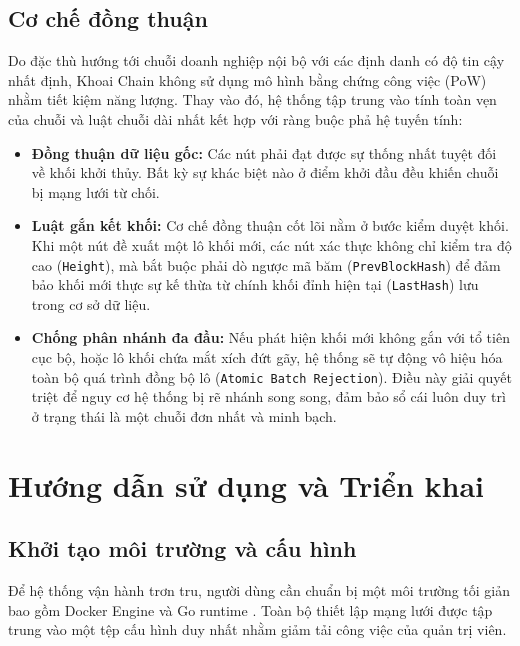 \documentclass[12pt,a4paper]{article}
\begin{document}
\subsection{Cơ chế đồng thuận}
Do đặc thù hướng tới chuỗi doanh nghiệp nội bộ với các định danh có độ tin cậy nhất định, Khoai Chain không sử dụng mô hình bằng chứng công việc (PoW) nhằm tiết kiệm năng lượng. Thay vào đó, hệ thống tập trung vào tính toàn vẹn của chuỗi và luật chuỗi dài nhất kết hợp với ràng buộc phả hệ tuyến tính:
\begin{itemize}
    \item \textbf{Đồng thuận dữ liệu gốc:} Các nút phải đạt được sự thống nhất tuyệt đối về khối khởi thủy. Bất kỳ sự khác biệt nào ở điểm khởi đầu đều khiến chuỗi bị mạng lưới từ chối.
    \item \textbf{Luật gắn kết khối:} Cơ chế đồng thuận cốt lõi nằm ở bước kiểm duyệt khối. Khi một nút đề xuất một lô khối mới, các nút xác thực không chỉ kiểm tra độ cao (\texttt{Height}), mà bắt buộc phải dò ngược mã băm (\texttt{PrevBlockHash}) để đảm bảo khối mới thực sự kế thừa từ chính khối đỉnh hiện tại (\texttt{LastHash}) lưu trong cơ sở dữ liệu.
    \item \textbf{Chống phân nhánh đa đầu:} Nếu phát hiện khối mới không gắn với tổ tiên cục bộ, hoặc lô khối chứa mắt xích đứt gãy, hệ thống sẽ tự động vô hiệu hóa toàn bộ quá trình đồng bộ lô (\texttt{Atomic Batch Rejection}). Điều này giải quyết triệt để nguy cơ hệ thống bị rẽ nhánh song song, đảm bảo sổ cái luôn duy trì ở trạng thái là một chuỗi đơn nhất và minh bạch.
\end{itemize}
\newpage

\section{Hướng dẫn sử dụng và Triển khai}

\subsection{Khởi tạo môi trường và cấu hình}
Để hệ thống vận hành trơn tru, người dùng cần chuẩn bị một môi trường tối giản bao gồm Docker Engine và Go runtime \cite{donovan}. Toàn bộ thiết lập mạng lưới được tập trung vào một tệp cấu hình duy nhất nhằm giảm tải công việc của quản trị viên.
\end{document}
